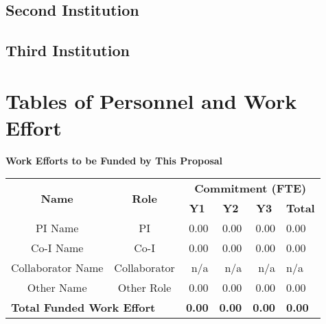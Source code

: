 \documentclass[oneside,12pt]{article}
\begin{document}
    \subsection{Second Institution}

    \subsection{Third Institution}

    \clearpage


    \section{Tables of Personnel and Work Effort}

    \bigskip
    \renewcommand{\arraystretch}{1.2}

    \begin{center}
        \textbf{Work Efforts to be Funded by This Proposal}
        \vspace{-1em}
    \end{center}

    \begin{table}[h]
        \centering
        \begin{tabular}{|c|c|r|r|r|l|}
            \hline
            \multirow{2}{*}{\textbf{Name}} & \multirow{2}{*}{\textbf{Role}} & \multicolumn{4}{c|}{\textbf{Commitment (FTE)}} \\
            \cline{3-6}
            & & \multicolumn{1}{c|}{\textbf{Y1}} & \multicolumn{1}{c|}{\textbf{Y2}} & \multicolumn{1}{c|}{\textbf{Y3}} & \multicolumn{1}{c|}{\textbf{Total}} \\
            \hline
            PI Name           & PI           & 0.00 & 0.00 & 0.00 & 0.00 \\
            Co-I Name         & Co-I         & 0.00 & 0.00 & 0.00 & 0.00 \\
            Collaborator Name & Collaborator & n/a  & n/a  & n/a  & n/a  \\
            Other Name        & Other Role   & 0.00 & 0.00 & 0.00 & 0.00 \\
            \hline
            \multicolumn{2}{|l|}{\textbf{Total Funded Work Effort}} & \textbf{0.00} & \textbf{0.00} & \textbf{0.00} & \textbf{0.00} \\
            \hline
        \end{tabular}
    \end{table}

    \vspace{1em}
\end{document}
